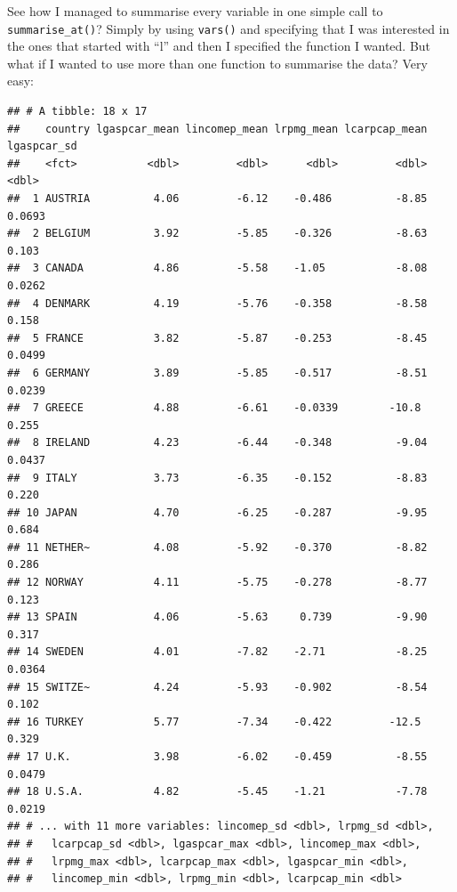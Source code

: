 \documentclass[]{gitbook}
\newenvironment{Shaded}{\begin{snugshade}}{\end{snugshade}}
\newcommand{\KeywordTok}[1]{\textcolor[rgb]{0.13,0.29,0.53}{\textbf{#1}}}
\newcommand{\NormalTok}[1]{#1}
\newcommand{\OperatorTok}[1]{\textcolor[rgb]{0.81,0.36,0.00}{\textbf{#1}}}
\newcommand{\StringTok}[1]{\textcolor[rgb]{0.31,0.60,0.02}{#1}}
\begin{document}
See how I managed to summarise every variable in one simple call to \texttt{summarise\_at()}? Simply by
using \texttt{vars()} and specifying that I was interested in the ones that started with ``l'' and then I
specified the function I wanted. But what if I wanted to use more than one function to summarise
the data? Very easy:

\begin{Shaded}
\end{Shaded}

\begin{verbatim}
## # A tibble: 18 x 17
##    country lgaspcar_mean lincomep_mean lrpmg_mean lcarpcap_mean lgaspcar_sd
##    <fct>           <dbl>         <dbl>      <dbl>         <dbl>       <dbl>
##  1 AUSTRIA          4.06         -6.12    -0.486          -8.85      0.0693
##  2 BELGIUM          3.92         -5.85    -0.326          -8.63      0.103 
##  3 CANADA           4.86         -5.58    -1.05           -8.08      0.0262
##  4 DENMARK          4.19         -5.76    -0.358          -8.58      0.158 
##  5 FRANCE           3.82         -5.87    -0.253          -8.45      0.0499
##  6 GERMANY          3.89         -5.85    -0.517          -8.51      0.0239
##  7 GREECE           4.88         -6.61    -0.0339        -10.8       0.255 
##  8 IRELAND          4.23         -6.44    -0.348          -9.04      0.0437
##  9 ITALY            3.73         -6.35    -0.152          -8.83      0.220 
## 10 JAPAN            4.70         -6.25    -0.287          -9.95      0.684 
## 11 NETHER~          4.08         -5.92    -0.370          -8.82      0.286 
## 12 NORWAY           4.11         -5.75    -0.278          -8.77      0.123 
## 13 SPAIN            4.06         -5.63     0.739          -9.90      0.317 
## 14 SWEDEN           4.01         -7.82    -2.71           -8.25      0.0364
## 15 SWITZE~          4.24         -5.93    -0.902          -8.54      0.102 
## 16 TURKEY           5.77         -7.34    -0.422         -12.5       0.329 
## 17 U.K.             3.98         -6.02    -0.459          -8.55      0.0479
## 18 U.S.A.           4.82         -5.45    -1.21           -7.78      0.0219
## # ... with 11 more variables: lincomep_sd <dbl>, lrpmg_sd <dbl>,
## #   lcarpcap_sd <dbl>, lgaspcar_max <dbl>, lincomep_max <dbl>,
## #   lrpmg_max <dbl>, lcarpcap_max <dbl>, lgaspcar_min <dbl>,
## #   lincomep_min <dbl>, lrpmg_min <dbl>, lcarpcap_min <dbl>
\end{verbatim}
\end{document}
